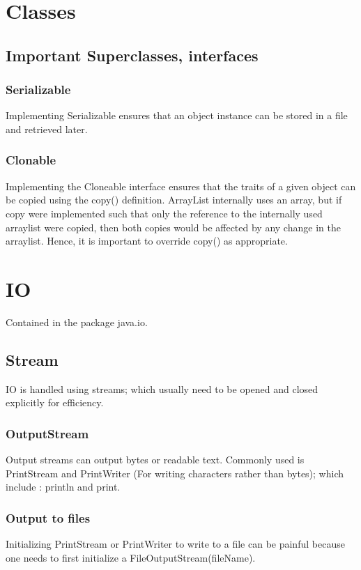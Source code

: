 \section{Classes}
\subsection{Important Superclasses, interfaces}
\subsubsection{Serializable}
Implementing Serializable ensures that an object instance can be stored in a file and retrieved later.

\subsubsection{Clonable}
Implementing the Cloneable interface ensures that the traits of a given object can be copied using the copy() definition. ArrayList internally uses an array, but if copy were implemented such that only the reference to the internally used arraylist were copied, then both copies would be affected by any change in the arraylist. Hence, it is important to override copy() as appropriate.

\section{IO}
Contained in the package java.io.

\subsection{Stream}
IO is handled using streams; which usually need to be opened and closed explicitly for efficiency.

\subsubsection{OutputStream}
Output streams can output bytes or readable text. Commonly used is PrintStream and PrintWriter (For writing characters rather than bytes); which include : println and print.

\subsubsection{Output to files}
Initializing PrintStream or PrintWriter to write to a file can be painful because one needs to first initialize a FileOutputStream(fileName).

